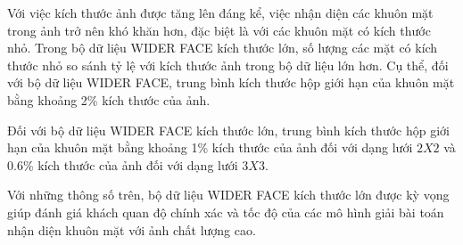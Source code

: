 {    \noindent
    Với việc kích thước ảnh được tăng lên đáng kể, việc nhận diện các khuôn mặt trong ảnh trở nên khó khăn hơn, đặc biệt là với các khuôn mặt có kích thước nhỏ.
    Trong bộ dữ liệu WIDER FACE kích thước lớn, số lượng các mặt có kích thước nhỏ so sánh tỷ lệ với kích thước ảnh trong bộ dữ liệu lớn hơn.
    Cụ thể, đối với bộ dữ liệu WIDER FACE, trung bình kích thước hộp giới hạn của khuôn mặt bằng khoảng 2\% kích thước của ảnh.

    \noindent
    Đối với bộ dữ liệu WIDER FACE kích thước lớn, trung bình kích thước hộp giới hạn của khuôn mặt bằng khoảng 1\% kích thước của ảnh đối với dạng lưới $2 X 2$ và 0.6\% kích thước của ảnh đối với dạng lưới $3 X 3$.

    \noindent
    Với những thông số trên, bộ dữ liệu WIDER FACE kích thước lớn được kỳ vọng giúp đánh giá khách quan độ chính xác và tốc độ của các mô hình giải bài toán nhận diện khuôn mặt với ảnh chất lượng cao.
}